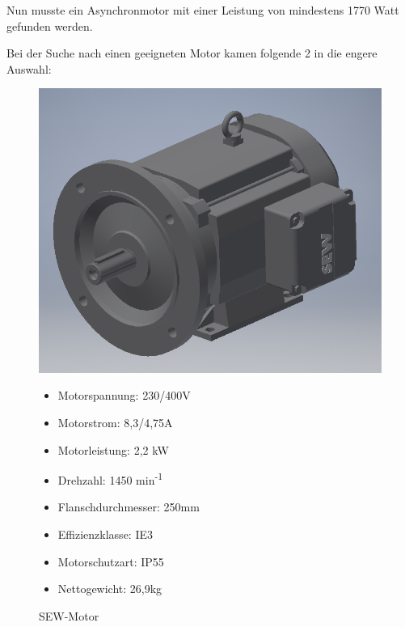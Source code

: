 \documentclass[12pt]{scrreprt} %
\begin{document}
Nun musste ein Asynchronmotor mit einer Leistung von mindestens 1770 Watt gefunden werden.


Bei der Suche nach einen geeigneten Motor kamen folgende 2 in die engere Auswahl:

\begin{figure}[!ht]
\begin{minipage}[t]{0.45\textwidth}
\includegraphics[width=\textwidth]{SEWMotor}
\caption{SEW-Motor}

\begin{itemize}
	\item{Motorspannung: 230/400V}
	\item{Motorstrom: 8,3/4,75A}
	\item{Motorleistung: 2,2 kW}
	\item{Drehzahl: 1450 min\textsuperscript{-1}}
	\item{Flanschdurchmesser: 250mm}
	\item{Effizienzklasse: IE3}
	\item{Motorschutzart: IP55}
	\item{Nettogewicht: 26,9kg}
\end{itemize}

\end{minipage}
\hspace{0.1\textwidth}
\begin{minipage}[t]{0.45\textwidth}


\end{minipage}
\end{figure}
\end{document}
